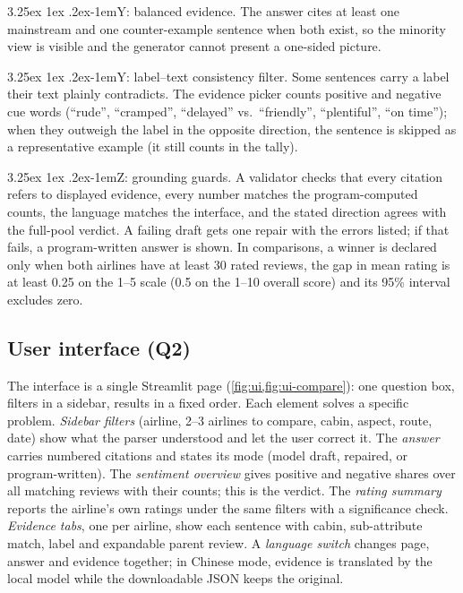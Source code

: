 \documentclass[10pt,twocolumn,a4paper]{article}
\makeatletter
\renewcommand\paragraph{\@startsection{paragraph}{4}{\parindent}%
  {3.25ex \@plus 1ex \@minus .2ex}{-1em}{\normalfont\normalsize\bfseries}}
\makeatother
\begin{document}
\paragraph{Y: balanced evidence.} The answer cites at least one mainstream and one counter-example sentence when both
exist, so the minority view is visible and the generator cannot present a one-sided picture.

\paragraph{Y: label--text consistency filter.} Some sentences carry a label their text plainly contradicts. The evidence
picker counts positive and negative cue words (``rude'', ``cramped'', ``delayed'' vs.\ ``friendly'', ``plentiful'', ``on
time''); when they outweigh the label in the opposite direction, the sentence is skipped as a representative example
(it still counts in the tally).

\paragraph{Z: grounding guards.} A validator checks that every citation refers to displayed evidence, every number
matches the program-computed counts, the language matches the interface, and the stated direction agrees with the
full-pool verdict. A failing draft gets one repair with the errors listed; if that fails, a program-written answer is
shown. In comparisons, a winner is declared only when both airlines have at least 30 rated reviews, the gap in mean rating
is at least 0.25 on the 1--5 scale (0.5 on the 1--10 overall score) and its 95\% interval excludes zero.

\subsection{User interface (Q2)}
\label{sec:ui}

The interface is a single Streamlit page (\cref{fig:ui,fig:ui-compare}): one question box, filters in a sidebar, results in a fixed
order. Each element solves a specific problem. \emph{Sidebar filters} (airline, 2--3 airlines to compare, cabin, aspect,
route, date) show what the parser understood and let the user correct it. The \emph{answer} carries numbered citations
and states its mode (model draft, repaired, or program-written). The \emph{sentiment overview} gives positive and
negative shares over all matching reviews with their counts; this is the verdict. The \emph{rating summary} reports the
airline's own ratings under the same filters with a significance check. \emph{Evidence tabs}, one per airline, show
each sentence with cabin, sub-attribute match, label and expandable parent review. A \emph{language switch} changes
page, answer and evidence together; in Chinese mode, evidence is translated by the local model while the downloadable
JSON keeps the original.
\end{document}
